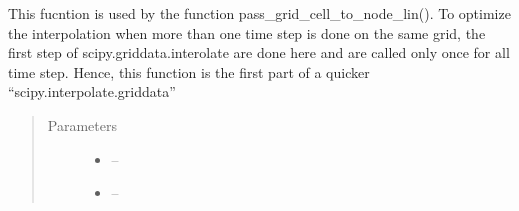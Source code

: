 \documentclass[letterpaper,10pt,english]{sphinxmanual}
\begin{document}

\begin{fulllineitems}
\label{\detokenize{index:src.manage_grid_8.interp_weights}}
This fucntion is used by the function pass\_grid\_cell\_to\_node\_lin(). To optimize the interpolation when more than one time step
is done on the same grid, the first step of scipy.griddata.interolate are done here and are called only once for all
time step. Hence, this function is the first part of a quicker ``scipy.interpolate.griddata''
\begin{quote}\begin{description}
\item[{Parameters}] \leavevmode\begin{itemize}
\item {} 
 -- 

\item {} 
 -- 

\end{itemize}

\end{description}\end{quote}

\end{fulllineitems}

\end{document}
